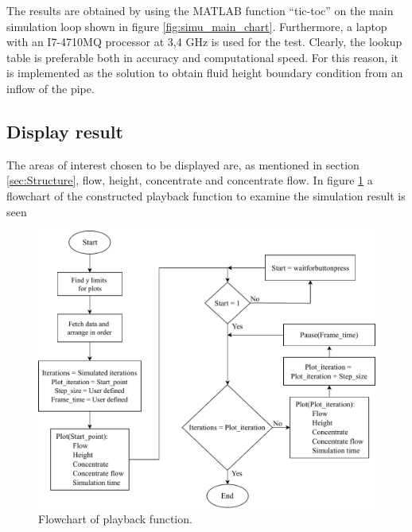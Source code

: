 The results are obtained by using the MATLAB function ``tic-toc'' on the main simulation loop shown in figure \ref{fig:simu_main_chart}. Furthermore, a laptop with an I7-4710MQ processor at 3,4 GHz is used for the test. Clearly, the lookup table is preferable both in accuracy and computational speed. For this reason, it is implemented as the solution to obtain fluid height boundary condition from an inflow of the pipe.

\subsection*{Display result}

The areas of interest chosen to be displayed are, as mentioned in section \ref{sec:Structure}, flow, height, concentrate and concentrate flow.
In figure \ref{fig:data_plot_chart} a flowchart of the constructed playback function to examine the simulation result is seen 

\begin{figure}[H]
\centering
\includegraphics[width=0.9 \textwidth]{report/simulation/pictures/data_plot_chart.pdf}
\caption{Flowchart of playback function.}
\label{fig:data_plot_chart}
\end{figure}

